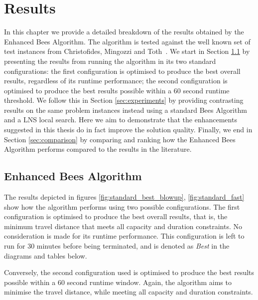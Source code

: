 
\chapter{Results}
\label{chap:results}

In this chapter we provide a detailed breakdown of the results obtained by the Enhanced Bees Algorithm. The algorithm is tested against the well known set of test instances from Christofides, Mingozzi and Toth~\cite{CMT:1981}. We start in Section \ref{sec:standardresults} by presenting the results from running the algorithm in its two standard configurations: the first configuration is optimised to produce the best overall results, regardless of its runtime performance; the second configuration is optimised to produce the best results possible within a 60 second runtime threshold. We follow this in Section \ref{sec:experiments} by providing contrasting results on the same problem instances instead using a standard Bees Algorithm and a LNS local search. Here we aim to demonstrate that the enhancements suggested in this thesis do in fact improve the solution quality. Finally, we end in Section \ref{sec:comparison} by comparing and ranking how the Enhanced Bees Algorithm performs compared to the results in the literature. 

\section{Enhanced Bees Algorithm}
\label{sec:standardresults}

The results depicted in figures \ref{fig:standard_best_blowup}, \ref{fig:standard_fast} show how the algorithm performs using two possible configurations. The first configuration is optimised to produce the best overall results, that is, the minimum travel distance that meets all capacity and duration constraints. No consideration is made for its runtime performance. This configuration is left to run for 30 minutes before being terminated, and is denoted as \emph{Best} in the diagrams and tables below.

Conversely, the second configuration used is optimised to produce the best results possible within a 60 second runtime window. Again, the algorithm aims to minimise the travel distance, while meeting all capacity and duration constraints.


